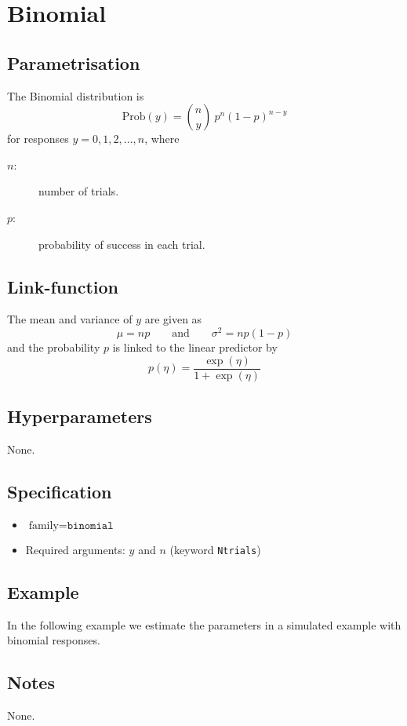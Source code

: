 \documentclass[a4paper,11pt]{article}
\begin{document}
\section*{Binomial}

\subsection*{Parametrisation}

The Binomial distribution is
\begin{displaymath}
    \text{Prob}(y) = {n \choose y} \ p^n (1-p)^{n-y}
\end{displaymath}
for responses $y=0, 1, 2, \ldots,n$, where
\begin{description}
\item[$n$:] number of trials.
\item[$p$:] probability of success in each trial.
\end{description}

\subsection*{Link-function}

The mean and variance of $y$ are given as
\begin{displaymath}
    \mu = np \qquad\text{and}\qquad \sigma^{2} = np(1-p)
\end{displaymath}
and the probability $p$ is linked to the linear predictor by
\begin{displaymath}
    p(\eta) = \frac{\exp(\eta)}{1+\exp(\eta)}
\end{displaymath}

\subsection*{Hyperparameters}

None.

\subsection*{Specification}

\begin{itemize}
\item $\text{family}=\texttt{binomial}$
\item Required arguments: $y$ and $n$ (keyword \texttt{Ntrials})
\end{itemize}

\subsection*{Example}

In the following example we estimate the parameters in a simulated
example with binomial responses.


\subsection*{Notes}

None.
\end{document}
